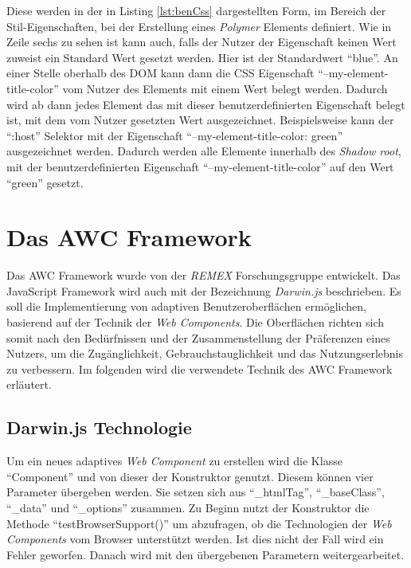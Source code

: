 \documentclass[12pt, paper=a4, bibtotoc, toc=listof, headsepline=true]{scrreprt}
\begin{document}
Diese werden in der in Listing \ref{lst:benCss} dargestellten Form, im Bereich der Stil-Eigenschaften, bei der Erstellung eines \emph{Polymer} Elements definiert. Wie in Zeile sechs zu sehen ist kann auch, falls der Nutzer der Eigenschaft keinen Wert zuweist ein Standard Wert gesetzt werden. Hier ist der Standardwert \enquote{blue}. An einer Stelle oberhalb des \ac{DOM} kann dann die \ac{CSS} Eigenschaft \enquote{--my-element-title-color} vom Nutzer des Elements mit einem Wert belegt werden. Dadurch wird ab dann jedes Element das mit dieser benutzerdefinierten Eigenschaft belegt ist, mit dem vom Nutzer gesetzten Wert ausgezeichnet. Beispielsweise kann der \enquote{:host} Selektor mit der Eigenschaft \enquote{--my-element-title-color: green} ausgezeichnet werden. Dadurch werden alle Elemente innerhalb des \emph{Shadow root}, mit der benutzerdefinierten Eigenschaft \enquote{--my-element-title-color} auf den Wert \enquote{green} gesetzt.
\chapter{Das AWC Framework}	
Das \ac{AWC Framework} wurde von der \emph{REMEX} Forschungsgruppe entwickelt. Das JavaScript Framework wird auch mit der Bezeichnung \emph{Darwin.js} beschrieben. Es soll die Implementierung von adaptiven Benutzeroberflächen ermöglichen, basierend auf der Technik der \emph{Web Components}. Die Oberflächen richten sich somit nach den Bedürfnissen und der Zusammenstellung der Präferenzen eines Nutzers, um die Zugänglichkeit, Gebrauchstauglichkeit und das Nutzungserlebnis zu verbessern\cite{gitHubAwc}\cite{darwin}. Im folgenden wird die verwendete Technik des \ac{AWC Framework} erläutert. 
\section{Darwin.js Technologie}
Um ein neues adaptives \emph{Web Component} zu erstellen wird die Klasse \enquote{Component} und von dieser der Konstruktor genutzt. Diesem können vier Parameter übergeben werden. Sie setzen sich aus \enquote{\_htmlTag}, \enquote{\_baseClass}, \enquote{\_data} und \enquote{\_options} zusammen. Zu Beginn nutzt der Konstruktor die Methode \enquote{testBrowserSupport()} um abzufragen, ob die Technologien der \emph{Web Components} vom Browser unterstützt werden. Ist dies nicht der Fall wird ein Fehler geworfen. Danach wird mit den übergebenen Parametern weitergearbeitet.
\end{document}
